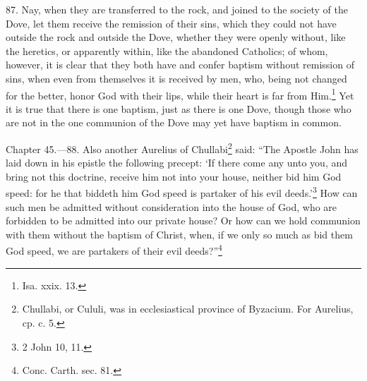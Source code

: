 87. Nay, when they are transferred to the rock, and joined to the society of the Dove, let them receive the remission of their sins, which they could not have outside the rock and outside the Dove, whether they were openly without, like the heretics, or apparently within, like the abandoned Catholics; of whom, however, it is clear that they both have and confer baptism without remission of sins, when even from themselves it is received by men, who, being not changed for the better, honor God with their lips, while their heart is far from Him.\footnote{\par  Isa. xxix. 13.} Yet it is true that there is one baptism, just as there is one Dove, though those who are not in the one communion of the Dove may yet have baptism in common.


Chapter 45.—88. Also another Aurelius of Chullabi\footnote{\par  Chullabi, or Cululi, was in ecclesiastical province of Byzacium. For Aurelius, cp. c. 5.} said: ``The Apostle John has laid down in his epistle the following precept: ‘If there come any unto you, and bring not this doctrine, receive him not into your house, neither bid him God speed: for he that biddeth him God speed is partaker of his evil deeds.’\footnote{\par  2 John 10, 11.} How can such men be admitted without consideration into the house of God, who are forbidden to be admitted into our private house? Or how can we hold communion with them without the baptism of Christ, when, if we only so much as bid them God speed, we are partakers of their evil deeds?''\footnote{\par  Conc. Carth. sec. 81.}

